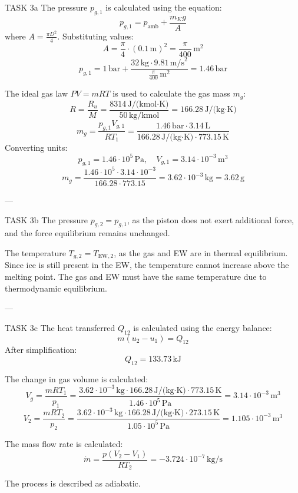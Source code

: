 TASK 3a  
The pressure \( p_{g,1} \) is calculated using the equation:  
\[
p_{g,1} = p_{\text{amb}} + \frac{m_K g}{A}
\]  
where \( A = \frac{\pi D^2}{4} \). Substituting values:  
\[
A = \frac{\pi}{4} \cdot (0.1 \, \text{m})^2 = \frac{\pi}{400} \, \text{m}^2
\]  
\[
p_{g,1} = 1 \, \text{bar} + \frac{32 \, \text{kg} \cdot 9.81 \, \text{m/s}^2}{\frac{\pi}{400} \, \text{m}^2} = 1.46 \, \text{bar}
\]  

The ideal gas law \( PV = mRT \) is used to calculate the gas mass \( m_g \):  
\[
R = \frac{R_u}{M} = \frac{8314 \, \text{J/(kmol·K)}}{50 \, \text{kg/kmol}} = 166.28 \, \text{J/(kg·K)}
\]  
\[
m_g = \frac{p_{g,1} V_{g,1}}{R T_1} = \frac{1.46 \, \text{bar} \cdot 3.14 \, \text{L}}{166.28 \, \text{J/(kg·K)} \cdot 773.15 \, \text{K}}
\]  
Converting units:  
\[
p_{g,1} = 1.46 \cdot 10^5 \, \text{Pa}, \quad V_{g,1} = 3.14 \cdot 10^{-3} \, \text{m}^3
\]  
\[
m_g = \frac{1.46 \cdot 10^5 \cdot 3.14 \cdot 10^{-3}}{166.28 \cdot 773.15} = 3.62 \cdot 10^{-3} \, \text{kg} = 3.62 \, \text{g}
\]  

---

TASK 3b  
The pressure \( p_{g,2} = p_{g,1} \), as the piston does not exert additional force, and the force equilibrium remains unchanged.  

The temperature \( T_{g,2} = T_{\text{EW},2} \), as the gas and EW are in thermal equilibrium. Since ice is still present in the EW, the temperature cannot increase above the melting point. The gas and EW must have the same temperature due to thermodynamic equilibrium.

---

TASK 3c  
The heat transferred \( Q_{12} \) is calculated using the energy balance:  
\[
m (u_2 - u_1) = Q_{12}
\]  
After simplification:  
\[
Q_{12} = 133.73 \, \text{kJ}
\]  

The change in gas volume is calculated:  
\[
V_g = \frac{m R T_1}{p_1} = \frac{3.62 \cdot 10^{-3} \, \text{kg} \cdot 166.28 \, \text{J/(kg·K)} \cdot 773.15 \, \text{K}}{1.46 \cdot 10^5 \, \text{Pa}} = 3.14 \cdot 10^{-3} \, \text{m}^3
\]  
\[
V_2 = \frac{m R T_2}{p_2} = \frac{3.62 \cdot 10^{-3} \, \text{kg} \cdot 166.28 \, \text{J/(kg·K)} \cdot 273.15 \, \text{K}}{1.05 \cdot 10^5 \, \text{Pa}} = 1.105 \cdot 10^{-3} \, \text{m}^3
\]  

The mass flow rate is calculated:  
\[
\dot{m} = \frac{p (V_2 - V_1)}{R T_2} = -3.724 \cdot 10^{-7} \, \text{kg/s}
\]  

The process is described as adiabatic.